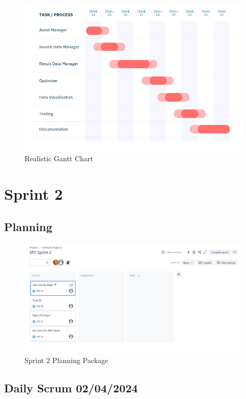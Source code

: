 \documentclass[12pt]{report}
\begin{document}
\begin{figure}[H]
  \centering
  \includegraphics[width=1\textwidth]{Resources/1-Sprint/Gantt-Chart-Realistic.png}
  \caption{Realistic Gantt Chart}
  \label{fig:RealGanttChart}
\end{figure}




\section{Sprint 2}
\subsection*{Planning}
\begin{figure}[H]
  \centering
  \includegraphics[width=1\textwidth]{Resources/2-Sprint/Planning/Sprint2_Planning_Package.png}
  \caption{Sprint 2 Planning Package}
  \label{fig:S2Planning}
\end{figure}

\subsection*{Daily Scrum 02/04/2024}
\end{document}
